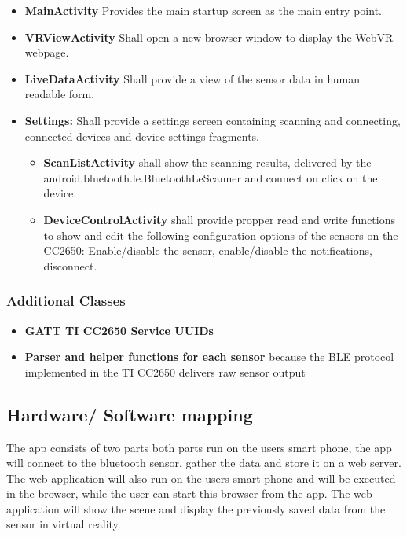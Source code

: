 \begin{itemize}
  \item \textbf{MainActivity} Provides the main startup screen as the main entry point.
  \item \textbf{VRViewActivity} Shall open a new browser window to display the WebVR webpage.
  \item \textbf{LiveDataActivity} Shall provide a view of the sensor data in human readable form.
  \item \textbf{Settings:} Shall provide a settings screen containing scanning and connecting, connected devices and device settings fragments.
  \begin{itemize}
    \item \textbf{ScanListActivity} shall show the scanning results, delivered by the android.bluetooth.le.BluetoothLeScanner and connect on click on the device.
    \item \textbf{DeviceControlActivity} shall provide propper read and write functions to show and edit the following configuration options of the sensors on the CC2650: Enable/disable the sensor, enable/disable the notifications, disconnect.
  \end{itemize}
\end{itemize}

\subsubsection{Additional Classes}
\begin{itemize}
  \item \textbf{GATT TI CC2650 Service UUIDs}
  \item \textbf{Parser and helper functions for each sensor} because the BLE protocol implemented in the TI CC2650 delivers raw sensor output
\end{itemize}

\subsection{Hardware/ Software mapping}

The app consists of two parts both parts run on the users smart phone, the app will connect to the bluetooth sensor, gather the data and store
it on a web server. The web application will also run on the users smart phone and will be executed in the browser, while the user can start this
browser from the app. The web application will show the scene and display the previously saved data from the sensor in virtual reality.

